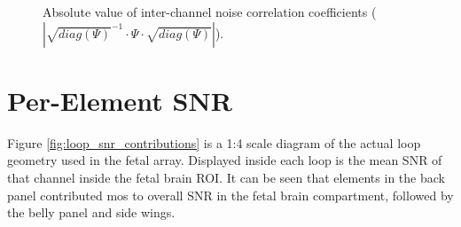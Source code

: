 \begin{figure}
    \caption{Absolute value of inter-channel noise correlation coefficients ($|\sqrt{diag(\Psi)}^{-1} \cdot \Psi \cdot
    \sqrt{diag(\Psi)}|$).}
\label{fig:noise_cor}
\end{figure}

\section{Per-Element SNR}
Figure \ref{fig:loop_snr_contributions} is a 1:4 scale diagram of the actual loop geometry used in the fetal array.
Displayed inside each loop is the mean SNR of that channel inside the fetal brain ROI. It can be seen that elements in
the back panel contributed mos to overall SNR in the fetal brain compartment, followed by the belly panel and side wings.


